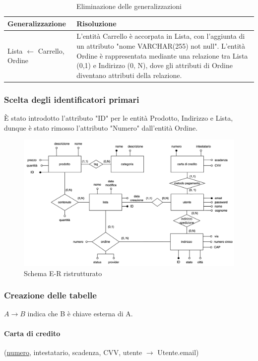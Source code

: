 \documentclass[11pt]{article}
\begin{document}
\begin{table}[H]
	\centering
	\begin{tabularx}{\textwidth}{|l|X|}
		\hline
		\textbf{Generalizzazione} & \textbf{Risoluzione} \\
		\hline
		Lista $\leftarrow$ Carrello, Ordine & L'entità Carrello è accorpata in
		Lista, con l'aggiunta di un attributo "nome VARCHAR(255) not null".
		L'entità Ordine è rappresentata mediante una relazione tra Lista (0,1) e
		Indirizzo (0, N), dove gli attributi di Ordine diventano attributi della
		relazione. \\
		\hline
	\end{tabularx}
	\caption{Eliminazione delle generalizzazioni}
\end{table}

\subsubsection{Scelta degli identificatori primari}
È stato introdotto l'attributo "ID" per le entità Prodotto, Indirizzo e Lista, 
dunque è stato rimosso l'attributo "Numero" dall'entità Ordine.


\begin{figure}[H]
	\centering
	\includegraphics[width=\textwidth]{schema_logico}
	\caption{Schema E-R ristrutturato}
\end{figure}

\subsubsection{Creazione delle tabelle}
$A \rightarrow B$ indica che B è chiave esterna di A.

\paragraph{Carta di credito}(\underline{numero}, intestatario, scadenza,
CVV, utente $\rightarrow$ Utente.email)
\end{document}
